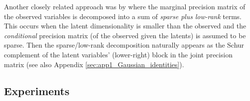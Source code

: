     Another closely related approach was by \citet{Chandrasekaran:Latent10} where the marginal precision matrix
    of the observed variables is decomposed into a sum of \emph{sparse plus low-rank} terms.
    This occurs when the latent dimensionality is smaller than the observed and the
    \emph{conditional} precision matrix (of the observed given the latents) is assumed to be sparse.
    Then the sparse/low-rank decomposition naturally appears as the Schur complement of the latent variables'
    (lower-right) block in the joint precision matrix (see also Appendix \ref{sec:app1_Gaussian_identities}).



    \subsection{Experiments} \label{subsec:chap5_experiments}

